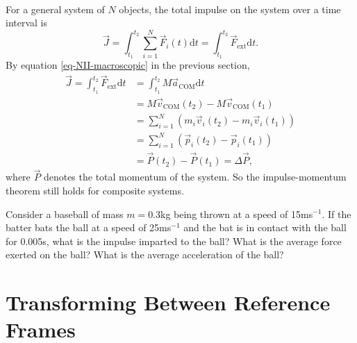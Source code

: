 \documentclass[../newtonian_mechanics.tex]{subfiles}
\begin{document}
        \paragraph{}
        For a general system of $N$ objects, the total impulse on the system over a time interval is
        \begin{equation}
            \vec{J}=\int_{t_1}^{t_2}\sum_{i=1}^N\vec{F}_i(t)\mathrm{d}t=\int_{t_1}^{t_2}\vec{F}_\text{ext}\mathrm{d}t.
        \end{equation}
        By equation \ref{eq-NII-macroscopic} in the previous section,
        \begin{align}
            \vec{J}=\int_{t_1}^{t_2}\vec{F}_\text{ext}\mathrm{d}t&=\int_{t_1}^{t_2}M\vec{a}_\text{COM}\mathrm{d}t\\
            &=M\vec{v}_\text{COM}(t_2) - M\vec{v}_\text{COM}(t_1)\\
            &=\sum_{i=1}^N\left(m_i\vec{v}_i(t_2) - m_i\vec{v}_i(t_1)\right)\\
            &=\sum_{i=1}^N\left(\vec{p}_i(t_2) - \vec{p}_i(t_1)\right)\\
            &=\vec{P}(t_2) - \vec{P}(t_1)=\Delta\vec{P},
        \end{align}
        where $\vec{P}$ denotes the total momentum of the system.
        So the impulse-momentum theorem still holds for composite systems.
        \begin{example}
            Consider a baseball of mass $m=$0.3kg being thrown at a speed of 15ms$^{-1}$.
            If the batter bats the ball at a speed of 25ms$^{-1}$ and the bat is in contact with the ball for 0.005s, what is the impulse imparted to the ball?
            What is the average force exerted on the ball? What is the average acceleration of the ball?
        \end{example}

    \section{Transforming Between Reference Frames}
\end{document}
